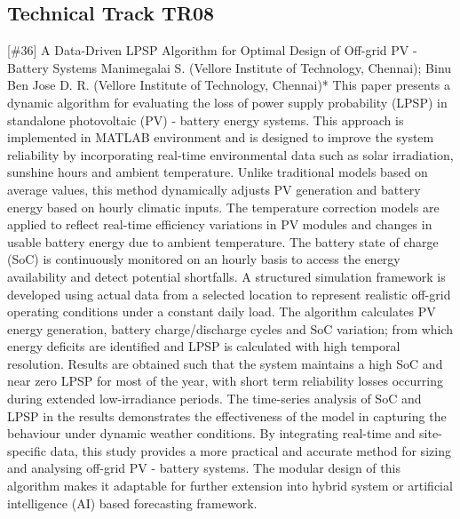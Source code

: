 \clearpage \subsection{Technical Track TR08}\nopagebreak {} \begin{abstract_online} {[\#36] A Data-Driven LPSP Algorithm for Optimal Design of Off-grid PV - Battery Systems} {} {Manimegalai S. (Vellore Institute of Technology, Chennai); Binu Ben Jose D. R. (Vellore Institute of Technology, Chennai)*} {} This paper presents a dynamic algorithm for evaluating the loss of power supply probability (LPSP) in standalone photovoltaic (PV) - battery energy systems. This approach is implemented in MATLAB environment and is designed to improve the system reliability by incorporating real-time environmental data such as solar irradiation, sunshine hours and ambient temperature. Unlike traditional models based on average values, this method dynamically adjusts PV generation and battery energy based on hourly climatic inputs. The temperature correction models are applied to reflect real-time efficiency variations in PV modules and changes in usable battery energy due to ambient temperature. The battery state of charge (SoC) is continuously monitored on an hourly basis to access the energy availability and detect potential shortfalls. A structured simulation framework is developed using actual data from a selected location to represent realistic off-grid operating conditions under a constant daily load. The algorithm calculates PV energy generation, battery charge/discharge cycles and SoC variation; from which energy deficits are identified and LPSP is calculated with high temporal resolution. Results are obtained such that the system maintains a high SoC and near zero LPSP for most of the year, with short term reliability losses occurring during extended low-irradiance periods. The time-series analysis of SoC and LPSP in the results demonstrates the effectiveness of the model in capturing the behaviour under dynamic weather conditions. By integrating real-time and site-specific data, this study provides a more practical and accurate method for sizing and analysing off-grid PV - battery systems. The modular design of this algorithm makes it adaptable for further extension into hybrid system or artificial intelligence (AI) based forecasting framework. \end{abstract_online} 
